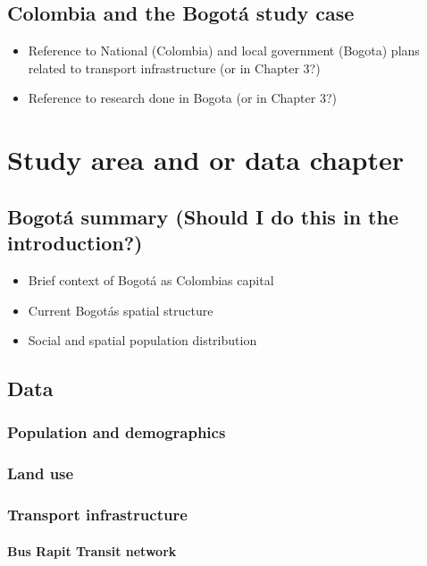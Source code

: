 \documentclass[12pt, a4paper]{report}
\begin{document}
\section{Colombia and the Bogot\'{a} study case}

\begin{itemize}
  \item Reference to National (Colombia) and local government (Bogota) plans related to transport infrastructure (or in Chapter 3?)
  \item Reference to research done in Bogota (or in Chapter 3?)
\end{itemize}

\chapter{Study area and or data chapter} \label{Chap3}

\section{Bogot\'{a} summary (Should I do this in the introduction?)}

\begin{itemize}
  \item Brief context of Bogot\'{a} as Colombia\textquotesingle s capital
  \item Current Bogot\'{a}\textquotesingle s spatial structure
  \item Social and spatial population distribution
\end{itemize}

\section{Data}

\subsection{Population and demographics}

\subsection{Land use}

\subsection{Transport infrastructure}

\subsubsection{Bus Rapit Transit network}
\end{document}
